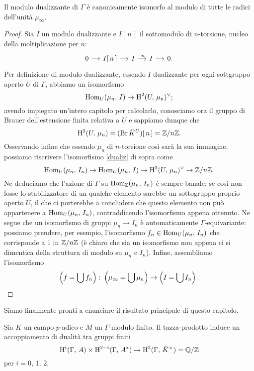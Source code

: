 \begin{proposition}
	Il modulo dualizzante di $ \Gamma $ è canonicamente isomorfo al modulo di tutte le radici dell'unità $ \mu_\infty $.
\end{proposition}
\begin{proof}
	Sia $ I $ un modulo dualizzante e $ I[\, n\, ] $ il sottomodulo di $ n $-torsione, nucleo della moltiplicazione per $ n $:
	\[ \begin{tikzcd}[column sep = small]
	0 \rar & I[\, n \,] \rar & I \rar["\cdot n"] & I \rar & 0.
	\end{tikzcd} \]
	Per definizione di modulo dualizzante, essendo $ I $ dualizzante per ogni sottgruppo aperto $ U $ di $ \Gamma $, abbiamo un isomorfismo
	\begin{equation}\label{dualiz}
	\operatorname{Hom}_U(\mu_n, \, I) \to \operatorname{H}^2(U, \, \mu_n)^\vee;
	\end{equation}
	avendo impiegato un'intero capitolo per calcolarlo, conosciamo ora il gruppo di Brauer dell'estensione finita relativa a $ U $ e sappiamo dunque che $$  \operatorname{H}^2(U, \, \mu_n) = (\operatorname{Br} \bar{K}^U)[\, n\, ] = \mathbb{Z}/n\mathbb{Z}.  $$
	Osservando infine che essendo $ \mu_n $ di $ n $-torsione così sarà la sua immagine, possiamo riscrivere l'isomorfismo \eqref{dualiz} di sopra come
	\[ \operatorname{Hom}_U(\mu_n, \, I_n) \to \operatorname{Hom}_U(\mu_n, \, I) \to \operatorname{H}^2(U, \, \mu_n)^\vee \to \mathbb{Z}/n\mathbb{Z}. \]
	Ne deduciamo che l'azione di $ \Gamma $ su $ \operatorname{Hom}_{\mathbb{Z}}(\mu_n, \, I_n) $ è sempre banale: se così non fosse lo stabilizzatore di un qualche elemento sarebbe un sottogruppo proprio aperto $ U $, il che ci porterebbe a concludere che questo elemento non può appartenere a $ \operatorname{Hom}_U(\mu_n, \, I_n) $, contraddicendo l'isomorfismo appena ottenuto. Ne segue che un isomorfismo di gruppi $ \mu_n \to I_n $ è automaticamente $ \Gamma $-equivariante: possiamo prendere, per esempio, l'isomorfismo $ f_n \in \operatorname{Hom}_U(\mu_n, \, I_n) $ che corrisponde a $ 1 $ in $ \mathbb{Z}/n\mathbb{Z} $ (è chiaro che sia un isomorfismo non appena ci si dimentica della struttura di modulo su $ \mu_n $ e $ I_n $). Infine, assembliamo l'isomorfismo
	\[ \left(f = \bigcup f_n\right) \colon \left(\mu_\infty = \bigcup \mu_n\right) \to \left(I = \bigcup I_n\right). \qedhere \]
\end{proof}

Siamo finalmente pronti a enunciare il risultato principale di questo capitolo.
\begin{theorem}
	Sia $ K $ un campo $ p $-adico e $ M $ un $ \Gamma $-modulo finito. Il tazza-prodotto induce un accoppiamento di dualità tra gruppi finiti
	\[ \operatorname{H}^i(\Gamma, \, A) \times \operatorname{H}^{2-i}(\Gamma, \, A^*) \to \operatorname{H}^2(\Gamma, \, \bar{K}^\times) = \mathbb{Q} / \mathbb{Z} \]
	per $ i = 0, \, 1, \, 2 $.
\end{theorem}

